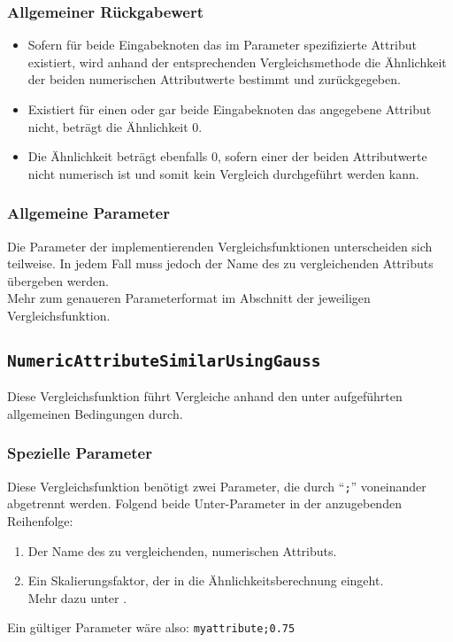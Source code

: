 \subsubsection*{Allgemeiner Rückgabewert}
\begin{itemize}
	\item Sofern für beide Eingabeknoten das im Parameter spezifizierte Attribut existiert, wird anhand der entsprechenden Vergleichsmethode die Ähnlichkeit der beiden numerischen Attributwerte bestimmt und zurückgegeben.
	\item Existiert für einen oder gar beide Eingabeknoten das angegebene Attribut nicht, beträgt die Ähnlichkeit $0$.
	\item Die Ähnlichkeit beträgt ebenfalls $0$, sofern einer der beiden Attributwerte nicht numerisch ist und somit kein Vergleich durchgeführt werden kann.
\end{itemize}

\subsubsection*{Allgemeine Parameter}
Die Parameter der implementierenden Vergleichsfunktionen unterscheiden sich teilweise. In jedem Fall muss jedoch der Name des zu vergleichenden Attributs übergeben werden.\\
Mehr zum genaueren Parameterformat im Abschnitt  der jeweiligen Vergleichsfunktion.


\newpage
%
%
\subsection{\texttt{NumericAttributeSimilarUsingGauss}}
Diese Vergleichsfunktion führt Vergleiche anhand den unter  aufgeführten allgemeinen Bedingungen durch.

\subsubsection*{Spezielle Parameter}
Diese Vergleichsfunktion benötigt zwei Parameter, die durch "`\texttt{;}"' voneinander abgetrennt werden. Folgend beide Unter-Parameter in der anzugebenden Reihenfolge:
\begin{enumerate}
	\item Der Name des zu vergleichenden, numerischen Attributs.
	\item Ein Skalierungsfaktor, der in die Ähnlichkeitsberechnung eingeht.\\
		Mehr dazu unter .
\end{enumerate}
Ein gültiger Parameter wäre also:  \texttt{myattribute;0.75}

